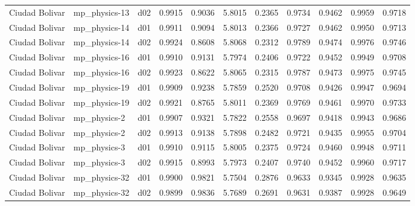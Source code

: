\begin{longtable}{lllrrrrrrrr}
       Ciudad Bolivar  &         mp\_physics-13 &     d02 &   0.9915 &   0.9036 &   5.8015 &       0.2365 &        0.9734 &       0.9462 &           0.9959 &  0.9718 \\
       Ciudad Bolivar  &         mp\_physics-14 &     d01 &   0.9911 &   0.9094 &   5.8013 &       0.2366 &        0.9727 &       0.9462 &           0.9950 &  0.9713 \\
       Ciudad Bolivar  &         mp\_physics-14 &     d02 &   0.9924 &   0.8608 &   5.8068 &       0.2312 &        0.9789 &       0.9474 &           0.9976 &  0.9746 \\
       Ciudad Bolivar  &         mp\_physics-16 &     d01 &   0.9910 &   0.9131 &   5.7974 &       0.2406 &        0.9722 &       0.9452 &           0.9949 &  0.9708 \\
       Ciudad Bolivar  &         mp\_physics-16 &     d02 &   0.9923 &   0.8622 &   5.8065 &       0.2315 &        0.9787 &       0.9473 &           0.9975 &  0.9745 \\
       Ciudad Bolivar  &         mp\_physics-19 &     d01 &   0.9909 &   0.9238 &   5.7859 &       0.2520 &        0.9708 &       0.9426 &           0.9947 &  0.9694 \\
       Ciudad Bolivar  &         mp\_physics-19 &     d02 &   0.9921 &   0.8765 &   5.8011 &       0.2369 &        0.9769 &       0.9461 &           0.9970 &  0.9733 \\
       Ciudad Bolivar  &          mp\_physics-2 &     d01 &   0.9907 &   0.9321 &   5.7822 &       0.2558 &        0.9697 &       0.9418 &           0.9943 &  0.9686 \\
       Ciudad Bolivar  &          mp\_physics-2 &     d02 &   0.9913 &   0.9138 &   5.7898 &       0.2482 &        0.9721 &       0.9435 &           0.9955 &  0.9704 \\
       Ciudad Bolivar  &          mp\_physics-3 &     d01 &   0.9910 &   0.9115 &   5.8005 &       0.2375 &        0.9724 &       0.9460 &           0.9948 &  0.9711 \\
       Ciudad Bolivar  &          mp\_physics-3 &     d02 &   0.9915 &   0.8993 &   5.7973 &       0.2407 &        0.9740 &       0.9452 &           0.9960 &  0.9717 \\
       Ciudad Bolivar  &         mp\_physics-32 &     d01 &   0.9900 &   0.9821 &   5.7504 &       0.2876 &        0.9633 &       0.9345 &           0.9928 &  0.9635 \\
       Ciudad Bolivar  &         mp\_physics-32 &     d02 &   0.9899 &   0.9836 &   5.7689 &       0.2691 &        0.9631 &       0.9387 &           0.9928 &  0.9649 \\

\end{longtable}
